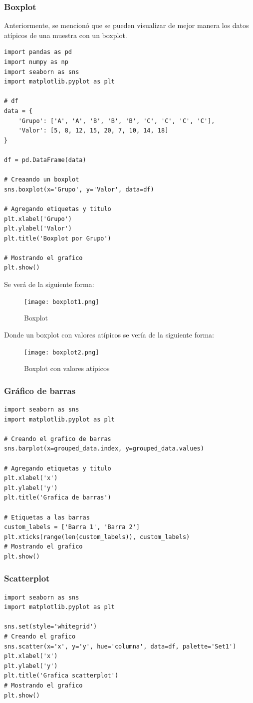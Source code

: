 \documentclass[a4paper, 12pt]{book}
\begin{document}
\subsubsection{Boxplot}
Anteriormente, se mencionó que se pueden visualizar de mejor manera los datos atípicos de una muestra con un boxplot.
\begin{verbatim}
import pandas as pd
import numpy as np
import seaborn as sns
import matplotlib.pyplot as plt
	
# df
data = {
	'Grupo': ['A', 'A', 'B', 'B', 'B', 'C', 'C', 'C', 'C'],
	'Valor': [5, 8, 12, 15, 20, 7, 10, 14, 18]
}
	
df = pd.DataFrame(data)

# Creaando un boxplot
sns.boxplot(x='Grupo', y='Valor', data=df)

# Agregando etiquetas y titulo
plt.xlabel('Grupo')
plt.ylabel('Valor')
plt.title('Boxplot por Grupo')
	
# Mostrando el grafico
plt.show()
\end{verbatim}
Se verá de la siguiente forma:
\begin{figure}[H] 
	\centering 
	\texttt{[image: boxplot1.png]}
	\caption{Boxplot}
\end{figure}
Donde un boxplot con valores atípicos se vería de la siguiente forma:

\begin{figure}[H] 
	\centering 
	\texttt{[image: boxplot2.png]}
	\caption{Boxplot con valores atípicos}
\end{figure}

\subsubsection{Gráfico de barras}
\begin{verbatim}
import seaborn as sns
import matplotlib.pyplot as plt
	
# Creando el grafico de barras
sns.barplot(x=grouped_data.index, y=grouped_data.values)
	
# Agregando etiquetas y titulo
plt.xlabel('x')
plt.ylabel('y')
plt.title('Grafica de barras')
	
# Etiquetas a las barras
custom_labels = ['Barra 1', 'Barra 2']
plt.xticks(range(len(custom_labels)), custom_labels)
# Mostrando el grafico
plt.show()
\end{verbatim}

\subsubsection{Scatterplot}
\begin{verbatim}
import seaborn as sns
import matplotlib.pyplot as plt
	
sns.set(style='whitegrid')
# Creando el grafico
sns.scatter(x='x', y='y', hue='columna', data=df, palette='Set1')
plt.xlabel('x')
plt.ylabel('y')
plt.title('Grafica scatterplot')
# Mostrando el grafico
plt.show()
\end{verbatim}
\end{document}
